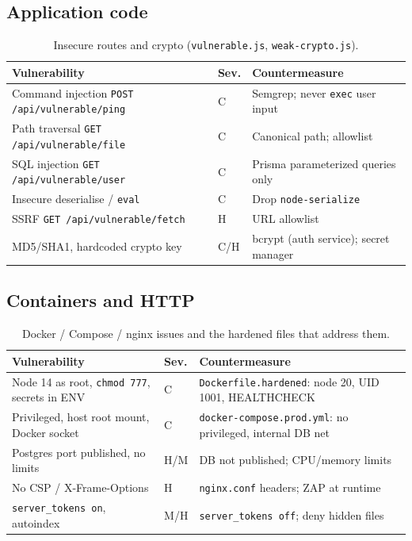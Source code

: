 \documentclass[11pt,a4paper]{article}
\newcommand{\thc}[1]{\textcolor{headtxt}{\textbf{#1}}}
\begin{document}
\subsection{Application code}
\begin{table}[H]
\centering
\caption{Insecure routes and crypto (\texttt{vulnerable.js}, \texttt{weak-crypto.js}).}
\begin{tabularx}{\textwidth}{@{}Y l Y@{}}
\toprule
{}\thc{Vulnerability} & \thc{Sev.} & \thc{Countermeasure} \\
\midrule
Command injection \texttt{POST /api/vulnerable/ping} & C & Semgrep; never \texttt{exec} user input \\
Path traversal \texttt{GET /api/vulnerable/file} & C & Canonical path; allowlist \\
SQL injection \texttt{GET /api/vulnerable/user} & C & Prisma parameterized queries only \\
Insecure deserialise / \texttt{eval} & C & Drop \texttt{node-serialize} \\
SSRF \texttt{GET /api/vulnerable/fetch} & H & URL allowlist \\
MD5/SHA1, hardcoded crypto key & C/H & bcrypt (auth service); secret manager \\
\bottomrule
\end{tabularx}
\end{table}

\subsection{Containers and HTTP}
\begin{table}[H]
\centering
\caption{Docker / Compose / nginx issues and the hardened files that address them.}
\begin{tabularx}{\textwidth}{@{}Y l Y@{}}
\toprule
{}\thc{Vulnerability} & \thc{Sev.} & \thc{Countermeasure} \\
\midrule
Node 14 as root, \texttt{chmod 777}, secrets in ENV & C & \texttt{Dockerfile.hardened}: node 20, UID 1001, HEALTHCHECK \\
Privileged, host root mount, Docker socket & C & \texttt{docker-compose.prod.yml}: no privileged, internal DB net \\
Postgres port published, no limits & H/M & DB not published; CPU/memory limits \\
No CSP / X-Frame-Options & H & \texttt{nginx.conf} headers; ZAP at runtime \\
\texttt{server\_tokens on}, autoindex & M/H & \texttt{server\_tokens off}; deny hidden files \\
\bottomrule
\end{tabularx}
\end{table}
\end{document}
